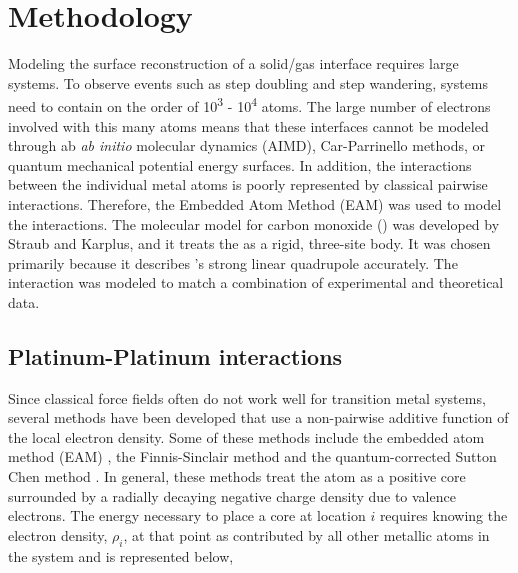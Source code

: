 \section{Methodology}
Modeling the surface reconstruction of a solid/gas interface requires large
systems.  To observe events such as step doubling and step wandering, systems
need to contain on the order of 10\textsuperscript{3} - 10\textsuperscript{4}
atoms. The large number of electrons involved with this many atoms means that
these interfaces cannot be modeled through ab {\em ab initio} molecular dynamics
(AIMD),\citep{Kresse:1993qf, Kresse:1993ve, Kresse:1994ul} Car-Parrinello
methods, \citep{Car:1985bh, Izvekov:2000fv, Guidelli:2000fy} or quantum
mechanical potential energy surfaces.  In addition, the interactions between
the individual metal atoms is poorly represented by classical pairwise
interactions.  Therefore, the Embedded Atom Method (EAM) \citep{Foiles:1986ky}
was used to model the  interactions.  The molecular model for
carbon monoxide () was developed by Straub and
Karplus,\citep{Straub:1991no} and it treats the  as a rigid, three-site
body. It was chosen primarily because it describes 's strong linear
quadrupole accurately.  The  interaction was modeled to match
a combination of experimental \citep{Yeo:1997th, Ertl:1977cg, Kelemen:1979ad}
and theoretical \citep{Deshlahra:2012aa, Korzeniewski:1986kl, Beurden:2002ys,
Deshlahra:2009wu, Feibelman:2001qa, Mason:2004ix} data. 

\subsection{Platinum-Platinum interactions}
Since classical force fields often do not work well for transition metal
systems, several methods have been developed that use a non-pairwise additive
function of the local electron density.  Some of these methods include the
embedded atom method (EAM) \citep{Foiles:1986ky, Daw:1984aq, Johnson:1989yr,
Daw:1989ci, Plimpton:1993qi, Lu:1997fv, Alemany:1998fp, Voter:1995ax}, the
Finnis-Sinclair method \citep{Finnis:1984hl, Sutton:1990rr} and the
quantum-corrected Sutton Chen method \citep{Qi:1999dn}.  In general, these
methods treat the atom as a positive core surrounded by a radially decaying
negative charge density due to valence electrons.  The energy necessary to
place a core at location $i$ requires knowing the electron density, $\rho_i$,
at that point as contributed by all other metallic atoms in the system and is
represented below, 

